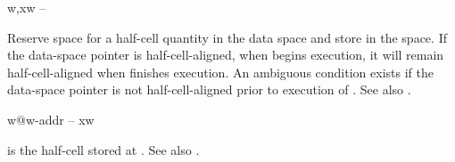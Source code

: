 \begin{gloss}{w,}{xw -- }

Reserve space for a half-cell quantity in the data space and store
 in the space.  If the data-space pointer is
half-cell-aligned, when  begins execution, it will remain
half-cell-aligned when  finishes execution.  An ambiguous
condition exists if the data-space pointer is not half-cell-aligned
prior to execution of .
See also .
\end{gloss}
\begin{gloss}{w@}{w-addr -- xw}

 is the half-cell stored at .
See also .
\end{gloss}
